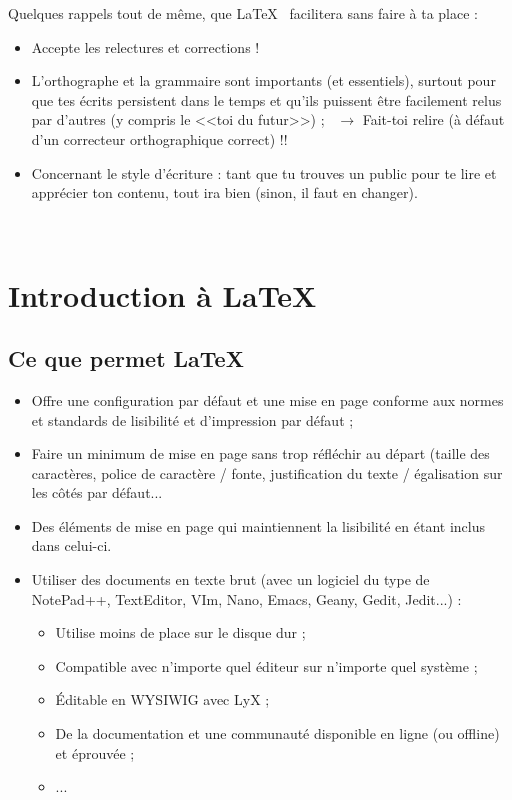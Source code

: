 \documentclass[11pt,twoside,a4paper]{article}
\begin{document}
\begin{landscape}
\begin{multicols}{2}
	Quelques rappels tout de même, que \LaTeX~ facilitera sans faire à ta place : 
	\begin{itemize}
		\item Accepte les relectures et corrections !
		\item L'orthographe et la grammaire sont importants (et essentiels), surtout pour que tes écrits persistent dans le temps et qu'ils puissent être facilement relus par d'autres (y compris le <<toi du futur>>) ;~\newline
			$\rightarrow$ Fait-toi relire (à défaut d'un correcteur orthographique correct) !!
		\item Concernant le style d'écriture : tant que tu trouves un public pour te lire et apprécier ton contenu, tout ira bien (sinon, il faut en changer). 
	\end{itemize}

	\vfill~\\
	\columnbreak
	
	\section{Introduction à \LaTeX}
	
	\subsection{Ce que permet \LaTeX}
	
	\begin{itemize}
		\item Offre une configuration par défaut et une mise en page conforme aux normes et standards de lisibilité et d'impression par défaut ; 
		\item Faire un minimum de mise en page sans trop réfléchir au départ (taille des caractères, police de caractère / fonte, justification du texte / égalisation sur les côtés par défaut...
		\item Des éléments de mise en page qui maintiennent la lisibilité en étant inclus dans celui-ci. 
		\item Utiliser des documents en texte brut (avec un logiciel du type de NotePad++, TextEditor, VIm, Nano, Emacs, Geany, Gedit, Jedit...) : 
		\begin{itemize}
			\item Utilise moins de place sur le disque dur ; 
			\item Compatible avec n'importe quel éditeur sur n'importe quel système ; 
			\item Éditable en WYSIWIG avec LyX ; 
			\item De la documentation et une communauté disponible en ligne (ou offline) et éprouvée ; 
			\item ...
		\end{itemize}
	\end{itemize}


\end{multicols}
\end{landscape}
\end{document}
